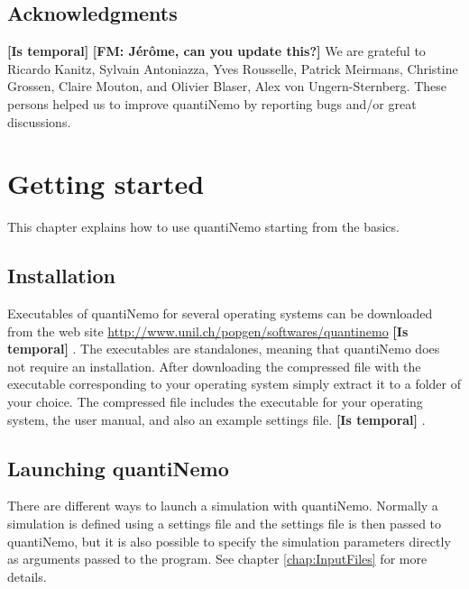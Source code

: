 \documentclass[letterpaper,12pt,oneside]{book}
\newcommand{\fm}[1]{\small {\bf \color{blue} [FM:  #1]} \normalsize}
\newcommand{\tbc}[1]{\small {\bf \color{red} [Is temporal]} \normalsize} %
\begin{document}
\section{Acknowledgments}
\tbc{}\fm{Jérôme, can you update this?}
We are grateful to Ricardo Kanitz, Sylvain Antoniazza, Yves Rousselle, Patrick Meirmans, Christine Grossen, Claire Mouton, and Olivier Blaser, Alex von Ungern-Sternberg. These persons helped us to improve quantiNemo by reporting bugs and/or great discussions. 




\newpage
\chapter{Getting started}
\label{chap:GettingStarted}
This chapter explains how to use quantiNemo starting from the basics. 


\section{Installation}
Executables of quantiNemo for several operating systems can be downloaded from the web site \url{http://www.unil.ch/popgen/softwares/quantinemo} \tbc{}. The executables are standalones, meaning that quantiNemo does not require an installation. After downloading the compressed file with the executable corresponding to your operating system simply extract it to a folder of your choice. The compressed file includes the executable for your operating system, the user manual, and also an example settings file.\tbc{}.


\section{Launching quantiNemo}\label{launchQuantiNemo}
There are different ways to launch a simulation with quantiNemo. Normally a simulation is defined using a settings file and the settings file is then passed to quantiNemo, but it is also possible to specify the simulation parameters directly as arguments passed to the program. See chapter \ref{chap:InputFiles} for more details. 
\end{document}
